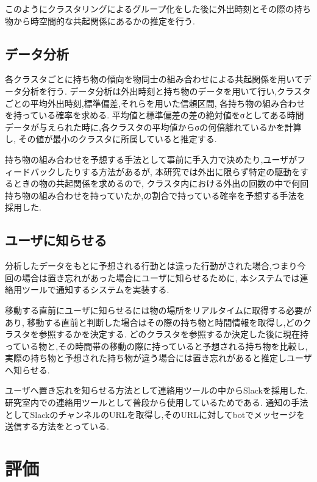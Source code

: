 \documentclass[a4j,8pt,twocolumn]{extarticle}
\begin{document}
このようにクラスタリングによるグループ化をした後に外出時刻とその際の持ち物から時空間的な共起関係にあるかの推定を行う.


\subsection{データ分析}

各クラスタごとに持ち物の傾向を物同士の組み合わせによる共起関係を用いてデータ分析を行う.
データ分析は外出時刻と持ち物のデータを用いて行い,クラスタごとの平均外出時刻,標準偏差,それらを用いた信頼区間,
各持ち物の組み合わせを持っている確率を求める.
平均値と標準偏差の差の絶対値をσとしてある時間データが与えられた時に,各クラスタの平均値からσの何倍離れているかを計算し,
その値が最小のクラスタに所属していると推定する.

持ち物の組み合わせを予想する手法として事前に手入力で決めたり,ユーザがフィードバックしたりする方法があるが,
本研究では外出に限らず特定の駆動をするときの物の共起関係を求めるので,
クラスタ内における外出の回数の中で何回持ち物の組み合わせを持っていたか,の割合で持っている確率を予想する手法を採用した.



\subsection{ユーザに知らせる}

分析したデータをもとに予想される行動とは違った行動がされた場合,つまり今回の場合は置き忘れがあった場合にユーザに知らせるために,
本システムでは連絡用ツールで通知するシステムを実装する.

移動する直前にユーザに知らせるには物の場所をリアルタイムに取得する必要があり,
移動する直前と判断した場合はその際の持ち物と時間情報を取得し,どのクラスタを参照するかを決定する.
どのクラスタを参照するか決定した後に現在持っている物と,その時間帯の移動の際に持っていると予想される持ち物を比較し,
実際の持ち物と予想された持ち物が違う場合には置き忘れがあると推定しユーザへ知らせる.

ユーザへ置き忘れを知らせる方法として連絡用ツールの中からSlackを採用した.
研究室内での連絡用ツールとして普段から使用しているためである.
通知の手法としてSlackのチャンネルのURLを取得し,そのURLに対してbotでメッセージを送信する方法をとっている.

\section{評価}
\end{document}
